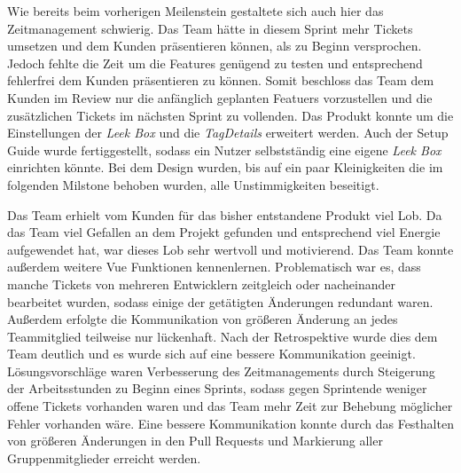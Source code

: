 \documentclass[10pt, a4paper]{article}
\begin{document}
\begin{onehalfspace}
Wie bereits beim vorherigen Meilenstein gestaltete sich auch hier das Zeitmanagement schwierig.
Das Team hätte in diesem Sprint mehr Tickets umsetzen und dem Kunden präsentieren können, als zu Beginn versprochen. Jedoch fehlte die Zeit um die Features genügend zu testen und entsprechend fehlerfrei dem Kunden präsentieren zu können.
Somit beschloss das Team dem Kunden im Review nur die anfänglich geplanten Featuers vorzustellen und die zusätzlichen Tickets im nächsten Sprint zu vollenden.
Das Produkt konnte um die Einstellungen der \textit{Leek Box} und die \textit{TagDetails}  erweitert werden.
Auch der Setup Guide wurde fertiggestellt, sodass ein Nutzer selbstständig eine eigene \textit{Leek Box} einrichten könnte.
Bei dem Design wurden, bis auf ein paar Kleinigkeiten die im folgenden Milstone behoben wurden, alle Unstimmigkeiten beseitigt.

Das Team erhielt vom Kunden für das bisher entstandene Produkt viel Lob.
Da das Team viel Gefallen an dem Projekt gefunden und entsprechend viel Energie aufgewendet hat, war dieses Lob sehr wertvoll und motivierend.
Das Team konnte außerdem weitere Vue Funktionen kennenlernen.
Problematisch war es, dass manche Tickets von mehreren Entwicklern zeitgleich oder nacheinander bearbeitet wurden, sodass einige der getätigten Änderungen redundant waren.
Außerdem erfolgte die Kommunikation von größeren Änderung an jedes Teammitglied teilweise nur lückenhaft.
Nach der Retrospektive wurde dies dem Team deutlich und es wurde sich auf eine bessere Kommunikation geeinigt.
Lösungsvorschläge waren Verbesserung des Zeitmanagements durch Steigerung der Arbeitsstunden zu Beginn eines Sprints, sodass gegen Sprintende weniger offene Tickets vorhanden waren und das Team mehr Zeit zur Behebung möglicher Fehler vorhanden wäre.
Eine bessere Kommunikation konnte durch das Festhalten von größeren Änderungen in den Pull Requests und Markierung aller Gruppenmitglieder erreicht werden.


\end{onehalfspace}
\end{document}
